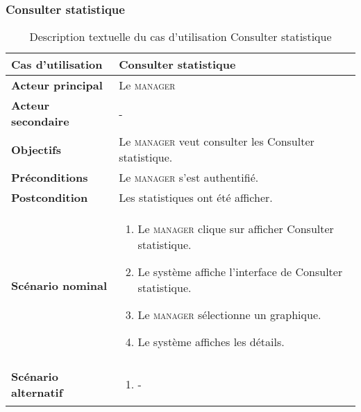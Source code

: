         \subsubsection[Consulter statistique]{Consulter statistique}
        \begin{longtable}{p{4cm} p{9cm}}
            \caption{Description textuelle du cas d’utilisation Consulter statistique}
            \label{table:usecaseConsStat}
            \\\hline\hline
                \textbf{Cas d’utilisation} & \textbf{Consulter statistique}
            \\\hline\hline
                    \textbf{Acteur principal} & Le \textsc{manager}
                \\
                    \textbf{Acteur secondaire} & -
                \\
                    \textbf{Objectifs} & Le \textsc{manager} veut consulter les Consulter statistique.
                \\
                    \textbf{Préconditions} & Le \textsc{manager} s’est authentifié.
                \\
                    \textbf{Postcondition} & Les statistiques ont été afficher.
                \\
                \textbf{Scénario nominal} &
                    \begin{enumerate}[leftmargin=*]
                        \item Le \textsc{manager} clique sur afficher Consulter statistique.
                        \item Le système affiche l’interface de Consulter statistique.
                        \item Le \textsc{manager} sélectionne un graphique.
                        \item Le système affiches les détails.
                    \end{enumerate}
                \\
                \textbf{Scénario alternatif} &
                    \begin{enumerate}[leftmargin=*]
                        \item -
                    \end{enumerate}
            \\\bottomrule
        \end{longtable}

